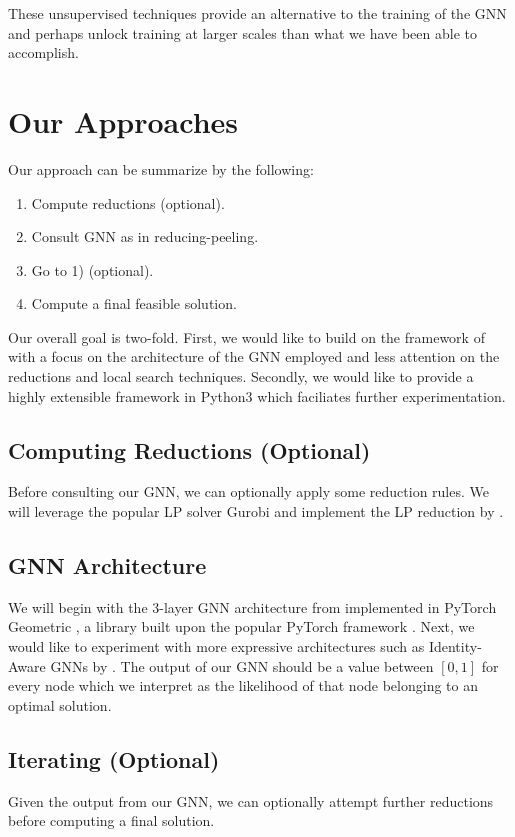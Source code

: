 \documentclass{article}
\begin{document}
These unsupervised techniques provide an alternative to the training of the GNN
and perhaps unlock training at larger scales than what we have been able to accomplish.

\section{Our Approaches}
Our approach can be summarize by the following:
\begin{enumerate}[1)]
  \item Compute reductions (optional).
  \item Consult GNN as in reducing-peeling.
  \item Go to 1) (optional).
  \item Compute a final feasible solution.
\end{enumerate}
Our overall goal is two-fold.
First, we would like to build on the framework of \citet{langedal_et_al}
with a focus on the architecture of the GNN employed
and less attention on the reductions and local search techniques.
Secondly, we would like to provide a highly extensible framework in Python3
which faciliates further experimentation.

\subsection{Computing Reductions (Optional)}
Before consulting our GNN,
we can optionally apply some reduction rules.
We will leverage the popular LP solver Gurobi \citet{gurobi}
and implement the LP reduction by \citet{lpreduction}.

\subsection{GNN Architecture}
We will begin with the 3-layer GNN architecture from \citet{langedal_et_al}
implemented in PyTorch Geometric \citet{pyg},
a library built upon the popular PyTorch framework \citet{pytorch}.
Next, we would like to experiment with more expressive architectures
such as Identity-Aware GNNs by \citet{idgnn}.
The output of our GNN should be a value between $[0, 1]$ for every node
which we interpret as the likelihood of that node belonging to an optimal solution.

\subsection{Iterating (Optional)}
Given the output from our GNN,
we can optionally attempt further reductions before computing a final solution.
\end{document}
